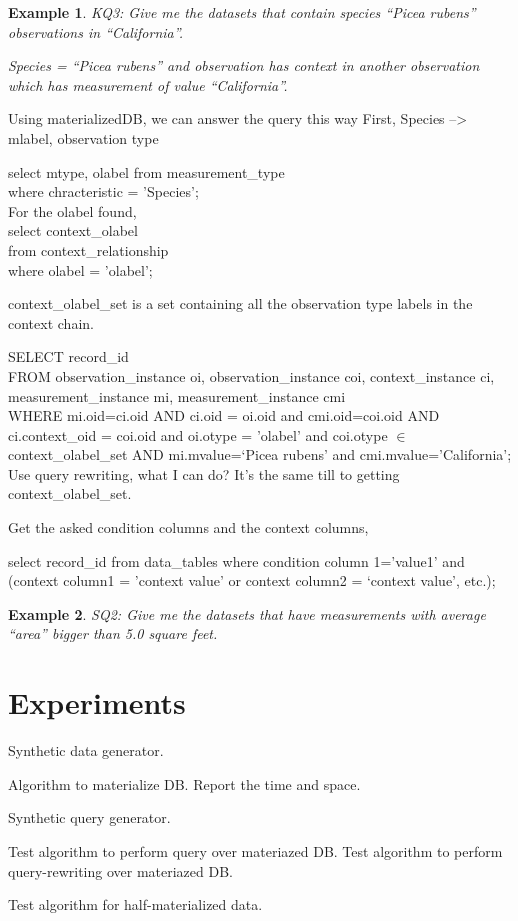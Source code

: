 \documentclass[10pt]{article}
\newtheorem{example}{Example}[section]
\begin{document}
\begin{example}
KQ3: Give me the datasets that contain species ``Picea rubens''
  observations in ``California''. 

Species = ``Picea rubens'' and observation has context {\em in}
another observation which has measurement of value ``California''. 
\end{example}

Using materializedDB, we can answer the query this way
First, Species --> mlabel, observation type 

select mtype, olabel from measurement\_type  \\
where chracteristic = 'Species';  \\

For the olabel found, \\
select context\_olabel\\
from context\_relationship\\
where olabel = 'olabel'; 

context\_olabel\_set is a set containing all the observation type
labels in the context chain. 

SELECT record\_id\\
FROM observation\_instance oi, observation\_instance coi,
context\_instance ci,
measurement\_instance mi, measurement\_instance cmi \\
WHERE mi.oid=ci.oid AND ci.oid = oi.oid and  cmi.oid=coi.oid AND ci.context\_oid =
coi.oid and oi.otype = 'olabel' and coi.otype $\in$
context\_olabel\_set
AND mi.mvalue=`Picea rubens' and cmi.mvalue='California';\\

Use query rewriting, what I can do? 
It's the same till to getting context\_olabel\_set. 

Get the asked condition columns and the context columns, 

select record\_id from data\_tables
where condition column 1='value1' and (context column1 = 'context
value' or context column2 = `context value', etc.);


\begin{example}
SQ2: Give me the datasets that have measurements with average ``area''
bigger than 5.0 square feet. 
\end{example}


\section{Experiments}

Synthetic data generator. 

Algorithm to materialize DB. 
Report the time and space. 

Synthetic query generator. 

Test algorithm to perform query over materiazed DB.
Test algorithm to perform query-rewriting over materiazed DB.

Test algorithm for half-materialized data.
\end{document}
